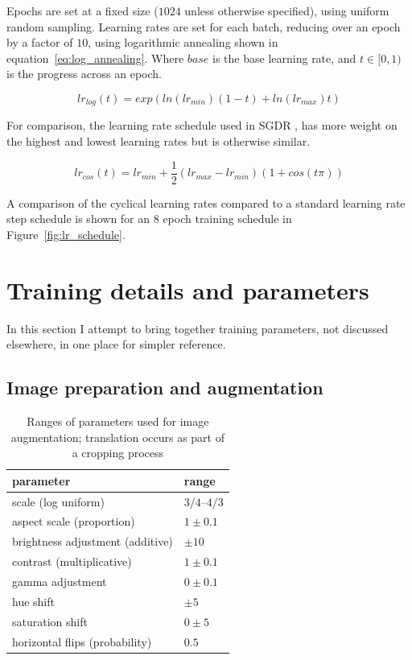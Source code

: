 Epochs are set at a fixed size ($1024$ unless otherwise specified), using uniform random sampling. Learning rates are set for each batch, reducing over an epoch by a factor of $10$, using logarithmic annealing shown in equation~\ref{eq:log_annealing}. Where $base$ is the base learning rate, and $ t \in [0, 1) $ is the progress across an epoch.

\begin{equation}
lr_{log}(t) = exp(ln (lr_{min}) (1 - t) + ln(lr_{max})  t)
\label{eq:log_annealing}
\end{equation}

For comparison, the learning rate schedule used in \gls{SGDR} \cite{Loshchilov2016}, has more weight on the highest and lowest learning rates but is otherwise similar.

\begin{equation}
lr_{cos}(t) = lr_{min} +  \frac{1}{2} (lr_{max} - lr_{min}) (1 + cos (t \pi))
\label{eq:cosine_annealing}
\end{equation}

A comparison of the cyclical learning rates compared to a standard learning rate step schedule is shown for an $8$ epoch training schedule in Figure~\ref{fig:lr_schedule}.

\section{Training details and parameters}
\label{sec:training_parameters}

In this section I attempt to bring together training parameters, not discussed elsewhere, in one place for simpler reference.

\subsection {Image preparation and augmentation}
\label{sec:preparation}

\begin{table}[h]
  \centering
    \caption{Ranges of parameters used for image augmentation; translation occurs as part of a cropping process}
    
  \begin{tabular}{ l  l }
    parameter & range \\
    \toprule
    scale (log uniform) & ${3/4}$--${4/3}$  \\ 
    aspect scale (proportion)  & $ 1 \pm 0.1 $  \\ 
    brightness adjustment (additive) & $ \pm 10 $ \\ 
    contrast (multiplicative) & $ 1 \pm 0.1 $ \\
    gamma adjustment & $ 0 \pm 0.1 $ \\ 
    hue shift & $ \pm 5 $ \\ 
    saturation shift & $ 0 \pm 5 $ \\ 
    horizontal flips (probability) & $ 0.5 $ \\ 
    
    \bottomrule
  \end{tabular}
\label{tab:obj_augmentation}
\end{table}

